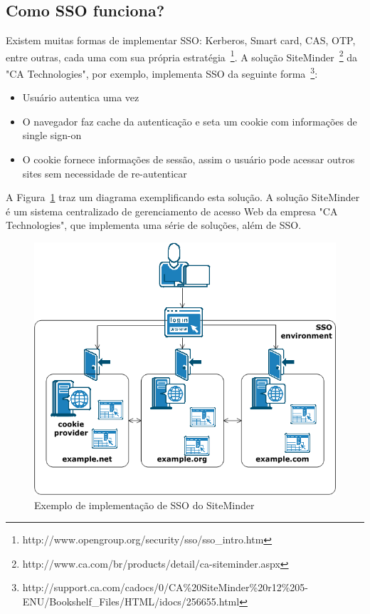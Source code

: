 \documentclass[11pt]{article}
\begin{document}

\subsection{Como SSO funciona?}

Existem muitas formas de implementar SSO: Kerberos, Smart card, CAS, OTP,
entre outras, cada uma com sua própria
estratégia~\footnote{http://www.opengroup.org/security/sso/sso\_intro.htm}. A solução
SiteMinder~\footnote{http://www.ca.com/br/products/detail/ca-siteminder.aspx}
da "CA Technologies", por exemplo, implementa SSO da seguinte
forma~\footnote{http://support.ca.com/cadocs/0/CA\%20SiteMinder\%20r12\%205-ENU/Bookshelf\_Files/HTML/idocs/256655.html}:

\begin{itemize}
  \item{Usuário autentica uma vez}
  \item{O navegador faz cache da autenticação e seta um cookie com
        informações de single sign-on}
  \item{O cookie fornece informações de sessão, assim o usuário pode acessar
        outros sites sem necessidade de re-autenticar}
\end{itemize}

A Figura~\ref{fig:sso-siteminder} traz um diagrama exemplificando esta
solução. A solução SiteMinder é um sistema centralizado de gerenciamento de
acesso Web da empresa "CA Technologies", que implementa uma série de soluções,
além de SSO.

\begin{figure}[h]
\center
\includegraphics[scale=0.6]{sso-siteminder.png}
\caption{Exemplo de implementação de SSO do SiteMinder}
\label{fig:sso-siteminder}
\end{figure}
\end{document}
